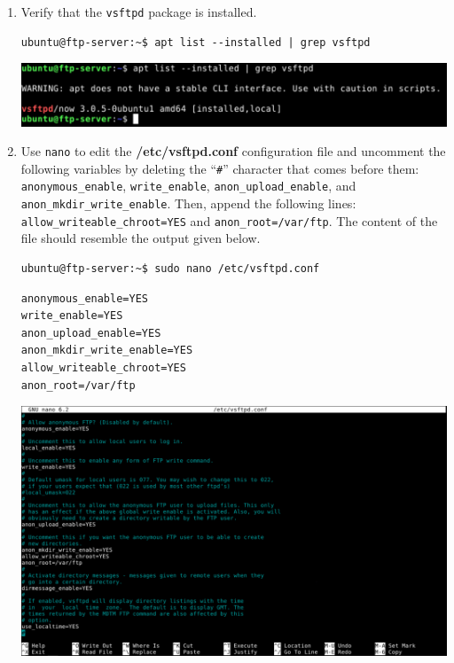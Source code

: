 \documentclass[letterpaper, 12pt]{article}
\begin{document}
\begin{enumerate}
    \item Verify that the \texttt{vsftpd} package is installed.
\begin{lstlisting}
ubuntu@ftp-server:~$ apt list --installed | grep vsftpd
\end{lstlisting}

    \begin{center}
        \includegraphics[width=\linewidth]{images/part1/step40.png}
    \end{center}

    \item Use \texttt{nano} to edit the \textbf{/etc/vsftpd.conf} configuration file and uncomment the following
    variables by deleting the ``\texttt{\#}'' character that comes before them: \texttt{anonymous\_enable},
    \texttt{write\_enable}, \texttt{anon\_upload\_enable}, and \texttt{anon\_mkdir\_write\_enable}. Then, append the
    following lines: \texttt{allow\_writeable\_chroot=YES} and \texttt{anon\_root=/var/ftp}. The content of the file
    should resemble the output given below.
\begin{lstlisting}
ubuntu@ftp-server:~$ sudo nano /etc/vsftpd.conf
\end{lstlisting}
\begin{lstlisting}
anonymous_enable=YES
write_enable=YES
anon_upload_enable=YES
anon_mkdir_write_enable=YES
allow_writeable_chroot=YES
anon_root=/var/ftp
\end{lstlisting}

    \begin{center}
        \includegraphics[width=\linewidth]{images/part1/step41.png}
    \end{center}


\end{enumerate}
\end{document}
